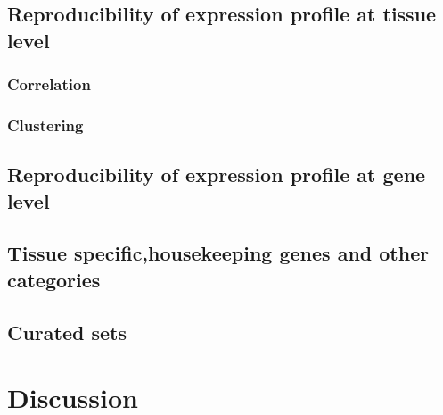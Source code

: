     \subsection{Reproducibility of expression profile at tissue level}\label{subsec:Trans_ReproExpresTissue}

        \subsubsection{Correlation}\label{subsubsec:Trans_Tissue_Corr}
        \subsubsection{Clustering}\label{subsubsec:Trans_Tissue_cluster}

    \subsection{Reproducibility of expression profile at gene level}\label{subsec:Trans_ReproExpresGene}

    \subsection{Tissue specific,housekeeping genes and other categories}\label{subsec:Trans_TissueSpeAndHK}

    \subsection{Curated sets}\label{subsec:Trans_curatedSets}

\section{Discussion}\label{sec:Trans_discussion}



\begin{comment}
  \begin{figure}%
      \includegraphics%
      {transcriptomics/}\centering
      \caption[]
      {\label{fig:}\textbf{}}
  \end{figure}
\end{comment}
